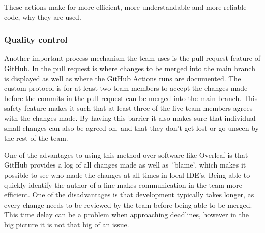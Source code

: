 These actions make for more efficient, more understandable and more reliable code, why they are used.


\subsubsection{Quality control}

Another important process mechanism the team uses is the pull request feature of GitHub.
In the pull request is where changes to be merged into the main branch is displayed as well as where the GitHub Actions
runs are documented.
The custom protocol is for at least two team members to accept the changes made before the commits in the pull request
can be merged into the main branch.
This safety feature makes it such that at least three of the five team members agrees with the changes made.
By having this barrier it also makes sure that individual small changes can also be agreed on, and that they don't get
lost or go unseen by the rest of the team.

One of the advantages to using this method over software like Overleaf is that GitHub provides a log of all changes made
as well as ´blame', which makes it possible to see who made the changes at all times in local IDE's.
Being able to quickly identify the author of a line makes communication in the team more efficient.
One of the disadvantages is that development typically takes longer, as every change needs to be reviewed by the team
before being able to be merged.
This time delay can be a problem when approaching deadlines, however in the big picture it is not that big of an issue.
